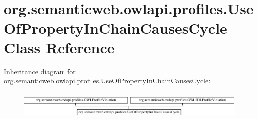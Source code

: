 \hypertarget{classorg_1_1semanticweb_1_1owlapi_1_1profiles_1_1_use_of_property_in_chain_causes_cycle}{\section{org.\-semanticweb.\-owlapi.\-profiles.\-Use\-Of\-Property\-In\-Chain\-Causes\-Cycle Class Reference}
\label{classorg_1_1semanticweb_1_1owlapi_1_1profiles_1_1_use_of_property_in_chain_causes_cycle}
}
Inheritance diagram for org.\-semanticweb.\-owlapi.\-profiles.\-Use\-Of\-Property\-In\-Chain\-Causes\-Cycle\-:\begin{figure}[H]
\begin{center}
\leavevmode
\includegraphics[height=1.375921cm]{classorg_1_1semanticweb_1_1owlapi_1_1profiles_1_1_use_of_property_in_chain_causes_cycle}
\end{center}
\end{figure}
